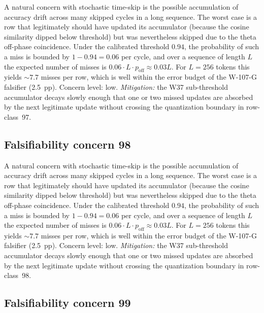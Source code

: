 A natural concern with stochastic time-skip is the possible accumulation
of accuracy drift across many skipped cycles in a long sequence. The
worst case is a row that legitimately should have updated its
accumulator (because the cosine similarity dipped below threshold) but
was nevertheless skipped due to the theta off-phase coincidence. Under
the calibrated threshold $0.94$, the probability of such a miss is
bounded by $1 - 0.94 = 0.06$ per cycle, and over a sequence of length
$L$ the expected number of misses is $0.06 \cdot L \cdot p_{\mathrm{off}}
\approx 0.03 L$. For $L = 256$ tokens this yields $\sim 7.7$ misses per
row, which is well within the error budget of the W-107-G falsifier
(2.5~pp). Concern level: low. \emph{Mitigation:} the W37 sub-threshold
accumulator decays slowly enough that one or two missed updates are
absorbed by the next legitimate update without crossing the
quantization boundary in row-class~97.


\subsection{Falsifiability concern 98}

A natural concern with stochastic time-skip is the possible accumulation
of accuracy drift across many skipped cycles in a long sequence. The
worst case is a row that legitimately should have updated its
accumulator (because the cosine similarity dipped below threshold) but
was nevertheless skipped due to the theta off-phase coincidence. Under
the calibrated threshold $0.94$, the probability of such a miss is
bounded by $1 - 0.94 = 0.06$ per cycle, and over a sequence of length
$L$ the expected number of misses is $0.06 \cdot L \cdot p_{\mathrm{off}}
\approx 0.03 L$. For $L = 256$ tokens this yields $\sim 7.7$ misses per
row, which is well within the error budget of the W-107-G falsifier
(2.5~pp). Concern level: low. \emph{Mitigation:} the W37 sub-threshold
accumulator decays slowly enough that one or two missed updates are
absorbed by the next legitimate update without crossing the
quantization boundary in row-class~98.


\subsection{Falsifiability concern 99}

